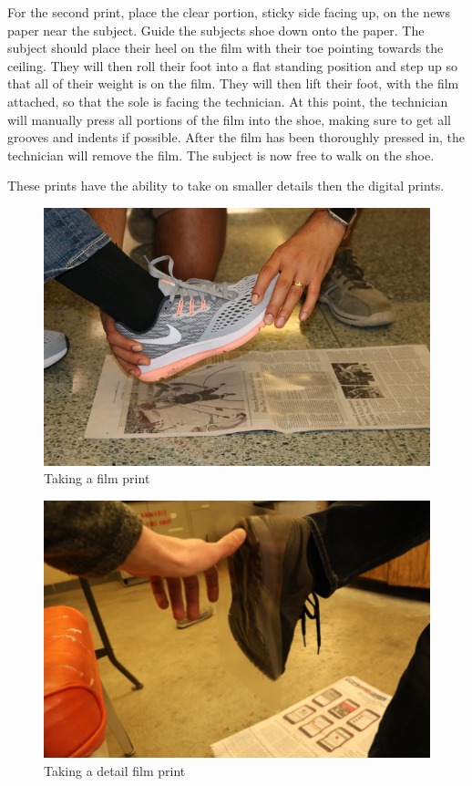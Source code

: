    For the second print, place the clear portion, sticky side facing up, on the news paper near the subject. Guide the subjects shoe down onto the paper. The subject should place their heel on the film with their toe pointing towards the ceiling. They will then roll their foot into a flat standing position and step up so that all of their weight is on the film. They will then lift their foot, with the film attached, so that the sole is facing the technician. At this point, the technician will manually press all portions of the film into the shoe, making sure to get all grooves and indents if possible. After the film has been thoroughly pressed in, the technician will remove the film. The subject is now free to walk on the shoe. 
   
   These prints have the ability to take on smaller details then the digital prints. 
   
\begin{figure}[!htp]
\centering
\includegraphics[width=12cm]{Film_Place}
\caption{Taking a film print}
\label{Image 13}
\end{figure}

\begin{figure}[!htp]
\centering
\includegraphics[width=12cm]{Press}
\caption{Taking a detail film print}
\label{Image 14}
\end{figure}

